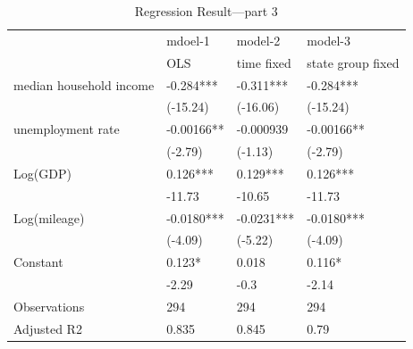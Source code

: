 \documentclass[man]{apa7}
\begin{document}
\begin{table}[htbp]
  \centering
  \caption{Regression Result---part 3}
  \begin{tabular}{p{9.285em}lll}
    \toprule
    \multicolumn{1}{c}{}    & \multicolumn{1}{p{7.645em}}{mdoel-1}    & \multicolumn{1}{p{8.57em}}{model-2}     & \multicolumn{1}{p{7.145em}}{model-3}           \\
    \multicolumn{1}{c}{}    & \multicolumn{1}{p{7.645em}}{OLS}        & \multicolumn{1}{p{8.57em}}{time fixed } & \multicolumn{1}{p{7.145em}}{state group fixed} \\
    \midrule
    median household income & \multicolumn{1}{p{7.645em}}{-0.284***}  & \multicolumn{1}{p{8.57em}}{-0.311***}   & \multicolumn{1}{p{7.145em}}{-0.284***}         \\
    \multicolumn{1}{r}{}    & \multicolumn{1}{p{7.645em}}{(-15.24)}   & \multicolumn{1}{p{8.57em}}{(-16.06)}    & \multicolumn{1}{p{7.145em}}{(-15.24)}          \\
    unemployment rate       & \multicolumn{1}{p{7.645em}}{-0.00166**} & -0.000939                               & \multicolumn{1}{p{7.145em}}{-0.00166**}        \\
    \multicolumn{1}{r}{}    & \multicolumn{1}{p{7.645em}}{(-2.79)}    & \multicolumn{1}{p{8.57em}}{(-1.13)}     & \multicolumn{1}{p{7.145em}}{(-2.79)}           \\
    Log(GDP)                & \multicolumn{1}{p{7.645em}}{0.126***}   & \multicolumn{1}{p{8.57em}}{0.129***}    & \multicolumn{1}{p{7.145em}}{0.126***}          \\
    \multicolumn{1}{r}{}    & -11.73                                  & -10.65                                  & -11.73                                         \\
    Log(mileage)            & \multicolumn{1}{p{7.645em}}{-0.0180***} & \multicolumn{1}{p{8.57em}}{-0.0231***}  & \multicolumn{1}{p{7.145em}}{-0.0180***}        \\
    \multicolumn{1}{r}{}    & \multicolumn{1}{p{7.645em}}{(-4.09)}    & \multicolumn{1}{p{8.57em}}{(-5.22)}     & \multicolumn{1}{p{7.145em}}{(-4.09)}           \\
    Constant                & \multicolumn{1}{p{7.645em}}{0.123*}     & 0.018                                   & \multicolumn{1}{p{7.145em}}{0.116*}            \\
    \multicolumn{1}{r}{}    & -2.29                                   & -0.3                                    & -2.14                                          \\
    \midrule
    Observations            & 294                                     & 294                                     & 294                                            \\
    Adjusted R2             & 0.835                                   & 0.845                                   & 0.79                                           \\
    \bottomrule
  \end{tabular}%
  \label{Table 2.9}%
\end{table}%
\end{document}
